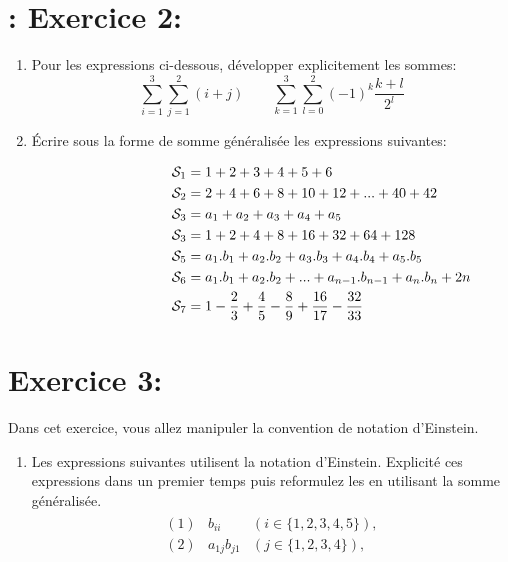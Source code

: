 \documentclass[11pt, french]{article}
\begin{document}
\section*{: Exercice 2:}
\begin{enumerate}
    \item Pour les expressions ci-dessous, développer explicitement les sommes:
    \begin{equation*}
    \sum_{i = 1}^{3}\sum_{j = 1}^{2} (i+j) \quad \quad \sum_{k = 1}^{3}\sum_{l = 0}^{2} (-1)^{k}\frac{k+l}{2^l} 
    \end{equation*}
    \item Écrire sous la forme de somme généralisée les expressions suivantes:
    \begin{fleqn}
    \begin{align*}
        \hspace{2.5cm}\mathcal{S}_1 &= 1 + 2 + 3 + 4 + 5 + 6\\
        \hspace{2.5cm}\mathcal{S}_2 &= 2 + 4 + 6 + 8 + 10 + 12 + ... + 40 + 42 \\
        \hspace{2.5cm}\mathcal{S}_3 &= a_1 + a_2 + a_3 + a_4 + a_5 \\
        \hspace{2.5cm}\mathcal{S}_3 &= 1 + 2 + 4 + 8 + 16 + 32 + 64 + 128  \\
        \hspace{2.5cm}\mathcal{S}_5 &= a_1.b_1 + a_2.b_2 + a_3.b_3 + a_4.b_4 + a_5.b_5 \\
        \hspace{2.5cm}\mathcal{S}_6 &= a_1.b_1 + a_2.b_2 + ... + a_{n-1}.b_{n-1} + a_n.b_n +2n\\
        \hspace{2.5cm}\mathcal{S}_7 &= 1 - \frac{2}{3} + \frac{4}{5} - \frac{8}{9} + \frac{16}{17} - \frac{32}{33}
    \end{align*}
    \end{fleqn}
\end{enumerate}

\section{Exercice 3:} 
Dans cet exercice, vous allez manipuler la convention de notation d'Einstein.
\begin{enumerate}
    \item Les expressions suivantes utilisent la notation d'Einstein. Explicité ces expressions dans un premier temps puis reformulez les en utilisant la somme généralisée.
    \begin{align*}
    \begin{matrix}
        (1) & b_{ii} & (i \in \{1, 2, 3, 4, 5\}),\\
        (2) & a_{1j}b_{j1} & (j \in \{1, 2, 3, 4\}),
    \end{matrix}
    \end{align*}
\end{enumerate}
\end{document}
